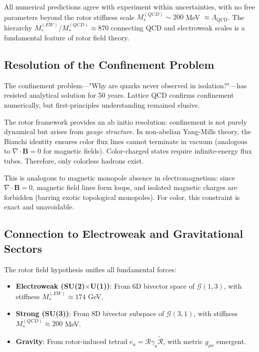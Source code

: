 \documentclass[11pt,a4paper]{article}
\newcommand{\rev}[1]{\widetilde{#1}}           %
\newcommand{\Rotor}{\mathcal{R}}
\newcommand{\Cl}{\mathcal{G}}
\theoremstyle{definition}
\theoremstyle{plain}
\theoremstyle{remark}
\begin{document}
All numerical predictions agree with experiment within uncertainties, with no free parameters beyond the rotor stiffness scale $M_*^{(QCD)} \sim 200$ MeV $\approx \Lambda_{\mathrm{QCD}}$. The hierarchy $M_*^{(EW)}/M_*^{(QCD)} \approx 870$ connecting QCD and electroweak scales is a fundamental feature of rotor field theory.

\subsection{Resolution of the Confinement Problem}

The confinement problem---"Why are quarks never observed in isolation?"---has resisted analytical solution for 50 years. Lattice QCD confirms confinement numerically, but first-principles understanding remained elusive.

The rotor framework provides an ab initio resolution: confinement is not purely dynamical but arises from \emph{gauge structure}. In non-abelian Yang-Mills theory, the Bianchi identity ensures color flux lines cannot terminate in vacuum (analogous to $\nabla \cdot \mathbf{B} = 0$ for magnetic fields). Color-charged states require infinite-energy flux tubes. Therefore, only colorless hadrons exist.

This is analogous to magnetic monopole absence in electromagnetism: since $\nabla \cdot \mathbf{B} = 0$, magnetic field lines form loops, and isolated magnetic charges are forbidden (barring exotic topological monopoles). For color, this constraint is exact and unavoidable.

\subsection{Connection to Electroweak and Gravitational Sectors}

The rotor field hypothesis unifies all fundamental forces:
\begin{itemize}[leftmargin=*,itemsep=3pt]
  \item \textbf{Electroweak (SU(2)$\times$U(1))}: From 6D bivector space of $\Cl(1,3)$, with stiffness $M_*^{(EW)} \approx 174$ GeV.
  \item \textbf{Strong (SU(3))}: From 8D bivector subspace of $\Cl(3,1)$, with stiffness $M_*^{(QCD)} \approx 200$ MeV.
  \item \textbf{Gravity}: From rotor-induced tetrad $e_a = \Rotor \gamma_a \rev{\Rotor}$, with metric $g_{\mu\nu}$ emergent.
\end{itemize}
\end{document}
